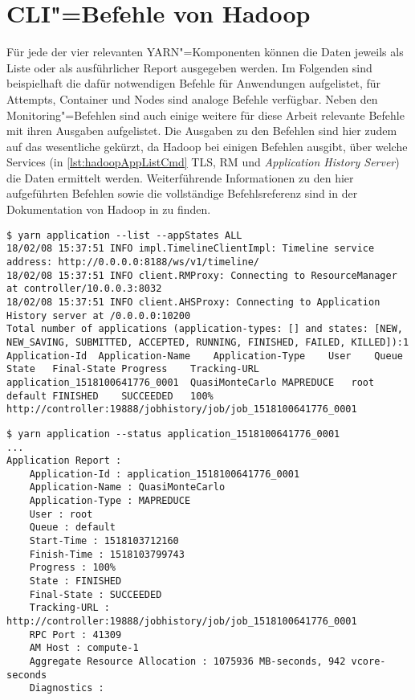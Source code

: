 \chapter{\acs{CLI}"=Befehle von Hadoop}
\label{app:hadoopCmds}

Für jede der vier relevanten YARN"=Komponenten können die Daten jeweils als Liste oder als ausführlicher Report ausgegeben werden.
Im Folgenden sind beispielhaft die dafür notwendigen Befehle für Anwendungen aufgelistet, für Attempts, Container und Nodes sind analoge Befehle verfügbar.
Neben den Monitoring"=Befehlen sind auch einige weitere für diese Arbeit relevante Befehle mit ihren Ausgaben aufgelistet.
Die Ausgaben zu den Befehlen sind hier zudem auf das wesentliche gekürzt, \uA da Hadoop bei einigen Befehlen ausgibt, über welche Services (in \cref{lst:hadoopAppListCmd} \zB \ac{TLS}, \ac{RM} und \emph{Application History Server}) die Daten ermittelt werden.
Weiterführende Informationen zu den hier aufgeführten Befehlen sowie die vollständige Befehlsreferenz sind in der Dokumentation von Hadoop in \cite{HadoopYarnCmds271} zu finden.

\begin{lstlisting}[label=lst:hadoopAppListCmd,style=plain,
caption={[\acs{CLI}"=Ausgabe der Anwendungsliste]
    \acs{CLI}"=Ausgabe der Anwendungsliste.
    Anwendungen können mithilfe der Optionen \mbox{\texttt{-{}-appTypes}} und \mbox{\texttt{-{}-appStates}} gefiltert werden.}]
$ yarn application --list --appStates ALL
18/02/08 15:37:51 INFO impl.TimelineClientImpl: Timeline service address: http://0.0.0.0:8188/ws/v1/timeline/
18/02/08 15:37:51 INFO client.RMProxy: Connecting to ResourceManager at controller/10.0.0.3:8032
18/02/08 15:37:51 INFO client.AHSProxy: Connecting to Application History server at /0.0.0.0:10200
Total number of applications (application-types: [] and states: [NEW, NEW_SAVING, SUBMITTED, ACCEPTED, RUNNING, FINISHED, FAILED, KILLED]):1
Application-Id	Application-Name	Application-Type	User	Queue	State	Final-State	Progress	Tracking-URL
application_1518100641776_0001	QuasiMonteCarlo	MAPREDUCE	root	default	FINISHED	SUCCEEDED	100%	http://controller:19888/jobhistory/job/job_1518100641776_0001
\end{lstlisting}

\begin{lstlisting}[label=lst:hadoopAppDetailsCmd,style=plain,
caption={\acs{CLI}"=Ausgabe des Reports einer Anwendung}]
$ yarn application --status application_1518100641776_0001
...
Application Report : 
    Application-Id : application_1518100641776_0001
    Application-Name : QuasiMonteCarlo
    Application-Type : MAPREDUCE
    User : root
    Queue : default
    Start-Time : 1518103712160
    Finish-Time : 1518103799743
    Progress : 100%
    State : FINISHED
    Final-State : SUCCEEDED
    Tracking-URL : http://controller:19888/jobhistory/job/job_1518100641776_0001
    RPC Port : 41309
    AM Host : compute-1
    Aggregate Resource Allocation : 1075936 MB-seconds, 942 vcore-seconds
    Diagnostics :
\end{lstlisting}


